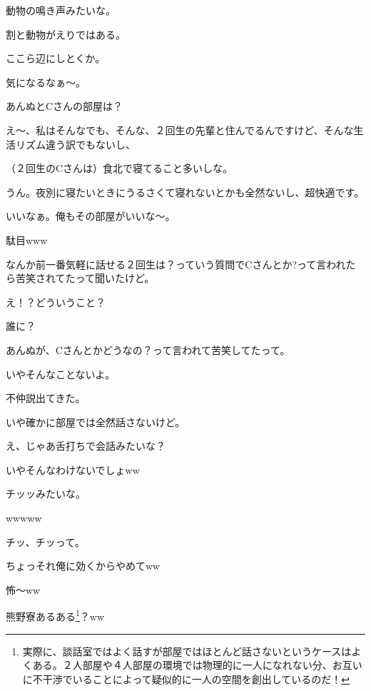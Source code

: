 \begin{multicols}{2}
  
動物の鳴き声みたいな。

  
割と動物がえりではある。

  
\centerline[（中略\footnote{面白いので載せたかったが、寮として公表できない話が続いたため不本意ながら省略した。詳しく知りたい方は入寮後C34ブロックの人に声をかけてみるといい。}）]

  
ここら辺にしとくか。

  
気になるなぁ～。

  
あんぬとCさんの部屋は？

  
え～、私はそんなでも、そんな、２回生の先輩と住んでるんですけど、そんな生活リズム違う訳でもないし、

  
（２回生のCさんは）食北で寝てること多いしな。

  
うん。夜別に寝たいときにうるさくて寝れないとかも全然ないし、超快適です。

  
いいなぁ。俺もその部屋がいいな～。

  
駄目www

  
なんか前一番気軽に話せる２回生は？っていう質問でCさんとか?って言われたら苦笑されてたって聞いたけど。

  
え！？どういうこと？

  
誰に？

  
あんぬが、Cさんとかどうなの？って言われて苦笑してたって。

  
いやそんなことないよ。

  
不仲説出てきた。

  
いや確かに部屋では全然話さないけど。

  
え、じゃあ舌打ちで会話みたいな？

  
いやそんなわけないでしょww

  
チッッみたいな。

  
wwwww

  
チッ、チッって。

  
ちょっそれ俺に効くからやめてww

  
怖～ww

  
熊野寮あるある\footnote{実際に、談話室ではよく話すが部屋ではほとんど話さないというケースはよくある。２人部屋や４人部屋の環境では物理的に一人になれない分、お互いに不干渉でいることによって疑似的に一人の空間を創出しているのだ！}？ww


\end{multicols}

